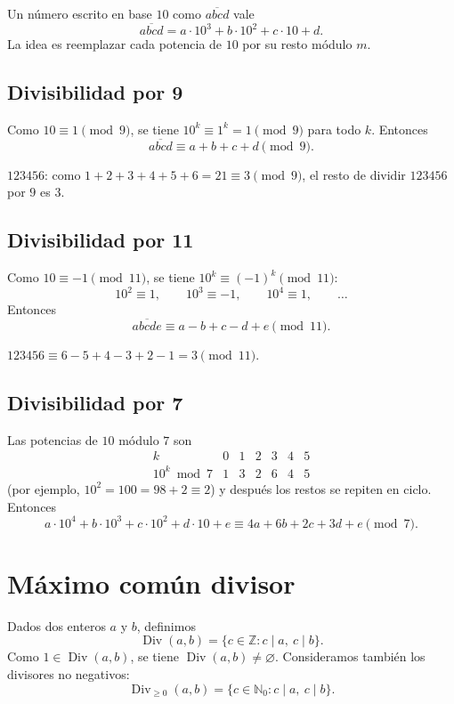 Un número escrito en base $10$ como $\overline{abcd}$ vale
\[
\overline{abcd} = a\cdot 10^3 + b\cdot 10^2 + c\cdot 10 + d.
\]
La idea es reemplazar cada potencia de $10$ por su resto módulo $m$.

\subsection{Divisibilidad por 9}

Como $10\equiv 1 \pmod 9$, se tiene $10^k\equiv 1^k = 1 \pmod 9$ para
todo $k$. Entonces
\[
\overline{abcd} \equiv a+b+c+d \pmod 9.
\]

\begin{ejemplo}
$123456$: como $1+2+3+4+5+6=21\equiv 3 \pmod 9$, el resto de dividir
$123456$ por $9$ es $3$.
\end{ejemplo}

\subsection{Divisibilidad por 11}

Como $10\equiv -1 \pmod{11}$, se tiene $10^k\equiv(-1)^k \pmod{11}$:
\[
10^2\equiv 1, \qquad 10^3\equiv -1, \qquad 10^4\equiv 1, \qquad \dots
\]
Entonces
\[
\overline{abcde} \equiv a-b+c-d+e \pmod{11}.
\]

\begin{ejemplo}
$123456 \equiv 6-5+4-3+2-1 = 3 \pmod{11}$.
\end{ejemplo}

\subsection{Divisibilidad por 7}

Las potencias de $10$ módulo $7$ son
\[
\begin{array}{c|cccccc}
k & 0 & 1 & 2 & 3 & 4 & 5 \\
\hline
10^k \bmod 7 & 1 & 3 & 2 & 6 & 4 & 5
\end{array}
\]
(por ejemplo, $10^2=100=98+2\equiv 2$) y después los restos se repiten
en ciclo. Entonces
\[
a\cdot 10^4 + b\cdot 10^3 + c\cdot 10^2 + d\cdot 10 + e
\equiv 4a + 6b + 2c + 3d + e \pmod 7.
\]

\section{Máximo común divisor}

Dados dos enteros $a$ y $b$, definimos
\[
\operatorname{Div}(a,b) = \{ c\in\mathbb{Z} : c\mid a,\ c\mid b\}.
\]
Como $1\in\operatorname{Div}(a,b)$, se tiene
$\operatorname{Div}(a,b)\neq\varnothing$. Consideramos también los
divisores no negativos:
\[
\operatorname{Div}_{\ge 0}(a,b) = \{ c\in\mathbb{N}_0 : c\mid a,\ c\mid b\}.
\]

